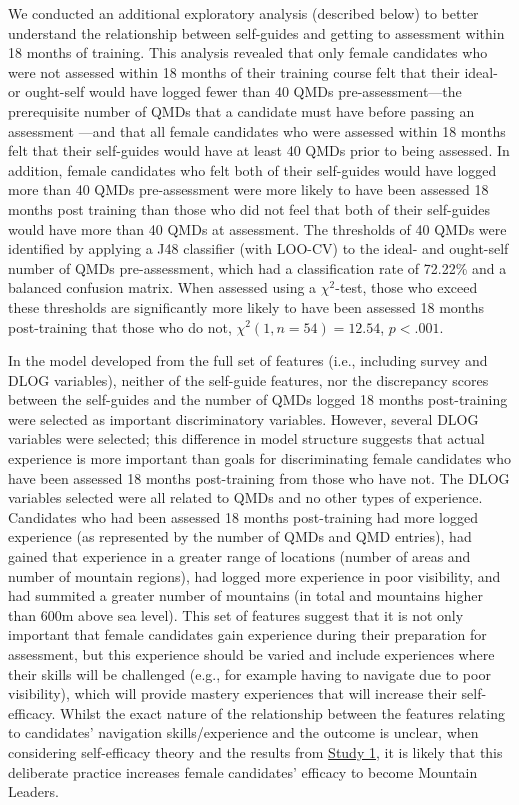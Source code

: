 \documentclass[
  12pt,
  a4paper,
]{book}
\begin{document}
We conducted an additional exploratory analysis (described below) to better understand the relationship between self-guides and getting to assessment within 18 months of training. This analysis revealed that only female candidates who were not assessed within 18 months of their training course felt that their ideal- or ought-self would have logged fewer than 40 QMDs pre-assessment---the prerequisite number of QMDs that a candidate must have before passing an assessment \citep{MTUK2015a}---and that all female candidates who were assessed within 18 months felt that their self-guides would have at least 40 QMDs prior to being assessed. In addition, female candidates who felt both of their self-guides would have logged more than 40 QMDs pre-assessment were more likely to have been assessed 18 months post training than those who did not feel that both of their self-guides would have more than 40 QMDs at assessment. The thresholds of 40 QMDs were identified by applying a J48 classifier (with LOO-CV) to the ideal- and ought-self number of QMDs pre-assessment, which had a classification rate of 72.22\% and a balanced confusion matrix. When assessed using a \(\chi^2\)-test, those who exceed these thresholds are significantly more likely to have been assessed 18 months post-training that those who do not, \(\chi^2(1, n = 54) = 12.54\), \(p < .001\).

In the model developed from the full set of features (i.e., including survey and DLOG variables), neither of the self-guide features, nor the discrepancy scores between the self-guides and the number of QMDs logged 18 months post-training were selected as important discriminatory variables. However, several DLOG variables were selected; this difference in model structure suggests that actual experience is more important than goals for discriminating female candidates who have been assessed 18 months post-training from those who have not. The DLOG variables selected were all related to QMDs and no other types of experience. Candidates who had been assessed 18 months post-training had more logged experience (as represented by the number of QMDs and QMD entries), had gained that experience in a greater range of locations (number of areas and number of mountain regions), had logged more experience in poor visibility, and had summited a greater number of mountains (in total and mountains higher than 600m above sea level). This set of features suggest that it is not only important that female candidates gain experience during their preparation for assessment, but this experience should be varied and include experiences where their skills will be challenged (e.g., for example having to navigate due to poor visibility), which will provide mastery experiences that will increase their self-efficacy. Whilst the exact nature of the relationship between the features relating to candidates' navigation skills/experience and the outcome is unclear, when considering self-efficacy theory and the results from \protect\hyperlink{ml-qualitative}{Study 1}, it is likely that this deliberate practice increases female candidates' efficacy to become Mountain Leaders.
\end{document}
